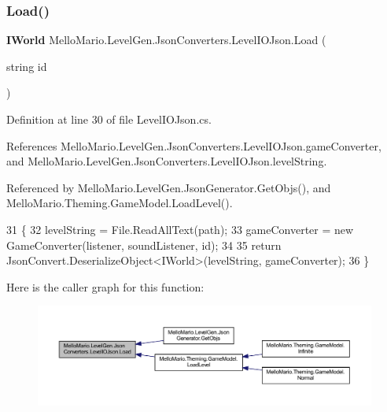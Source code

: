 \subsubsection{Load()}
{\footnotesize\ttfamily \textbf{ I\+World} Mello\+Mario.\+Level\+Gen.\+Json\+Converters.\+Level\+I\+O\+Json.\+Load (\begin{DoxyParamCaption}\item[{string}]{id }\end{DoxyParamCaption})}



Definition at line 30 of file Level\+I\+O\+Json.\+cs.



References Mello\+Mario.\+Level\+Gen.\+Json\+Converters.\+Level\+I\+O\+Json.\+game\+Converter, and Mello\+Mario.\+Level\+Gen.\+Json\+Converters.\+Level\+I\+O\+Json.\+level\+String.



Referenced by Mello\+Mario.\+Level\+Gen.\+Json\+Generator.\+Get\+Objs(), and Mello\+Mario.\+Theming.\+Game\+Model.\+Load\+Level().


\begin{DoxyCode}
31         \{
32             levelString = File.ReadAllText(path);
33             gameConverter = \textcolor{keyword}{new} GameConverter(listener, soundListener, \textcolor{keywordtype}{id});
34 
35             \textcolor{keywordflow}{return} JsonConvert.DeserializeObject<IWorld>(levelString, 
      gameConverter);
36         \}
\end{DoxyCode}
Here is the caller graph for this function\+:
\nopagebreak
\begin{figure}[H]
\begin{center}
\leavevmode
\includegraphics[width=350pt]{classMelloMario_1_1LevelGen_1_1JsonConverters_1_1LevelIOJson_aa3fd52213102bf6ca317746b70eb5819_icgraph}
\end{center}
\end{figure}
\mbox{\label{classMelloMario_1_1LevelGen_1_1JsonConverters_1_1LevelIOJson_a177805f77c73ca6effb407c07a495df0}} 
